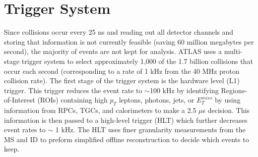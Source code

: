 \section{Trigger System}
Since collisions occur every 25 ns and reading out all detector channels and storing that information is not currently feasible (saving 60 million megabytes per second), the majority of events are not kept for analysis. ATLAS uses a multi-stage trigger system to select approximately 1,000 of the 1.7 billion collisions that occur each second (corresponding to a rate of 1 kHz from the 40 MHz proton collision rate). The first stage of the trigger system is the hardware level (L1) trigger. This trigger reduces the event rate to $\sim$100 kHz by identifying Regions-of-Interest (ROIs) containing high $p_{T}$ leptons, photons, jets, or $E_{T}^{miss}$ by using information from RPCs, TGCs, and calorimeters to make a 2.5 $\mu$s decision. This information is then passed to a high-level trigger (HLT) which further decreases event rates to $\sim$ 1 kHz. The HLT uses finer granularity measurements from the MS and ID to preform simplified offline reconstruction to decide which events to keep.
